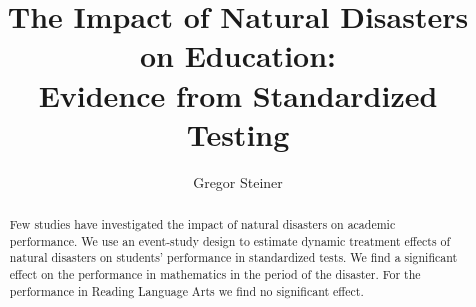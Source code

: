 \documentclass[11pt]{article}
\title{The Impact of Natural Disasters on Education: \\ Evidence from Standardized Testing}
\author{Gregor Steiner}
\begin{document}
\maketitle

\begin{abstract}
	\centering
	\begin{minipage}{\dimexpr\paperwidth-10cm}
		Few studies have investigated the impact of natural disasters on academic performance. We use an event-study design to estimate dynamic treatment effects of natural disasters on students' performance in standardized tests. We find a significant effect on the performance in mathematics in the period of the disaster. For the performance in Reading Language Arts we find no significant effect.
	\end{minipage}
\end{abstract}














\appendix





\end{document}
